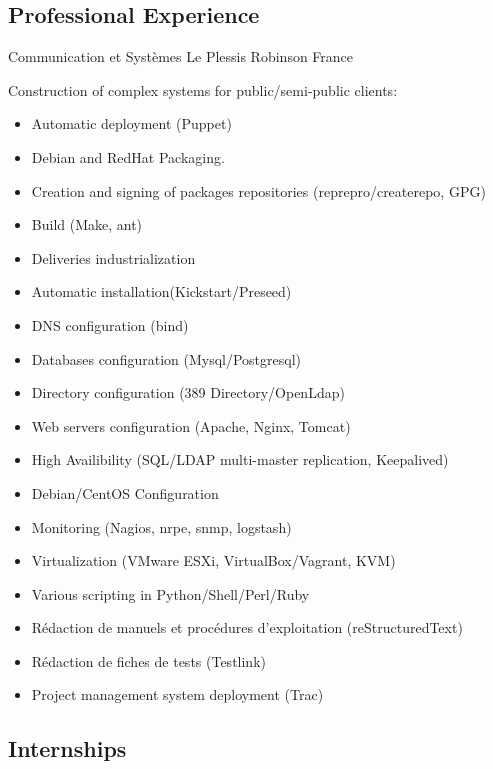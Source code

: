 \documentclass[10pt,a4paper]{moderncv}
\begin{document}
\subsection{Professional Experience}

              {Communication et Systèmes}
              {Le Plessis Robinson}
              {France}
              {Construction of complex systems for public/semi-public clients:
                \begin{itemize}
                \item Automatic deployment (Puppet)
                \item Debian and RedHat Packaging.
                \item Creation and signing of packages repositories (reprepro/createrepo, GPG)
                \item Build (Make, ant)
                \item Deliveries industrialization
                \item Automatic installation(Kickstart/Preseed)
                \item DNS configuration (bind)
                \item Databases configuration (Mysql/Postgresql)
                \item Directory configuration (389 Directory/OpenLdap)
                \item Web servers configuration (Apache, Nginx, Tomcat)
                \item High Availibility (SQL/LDAP multi-master replication, Keepalived)
                \item Debian/CentOS Configuration
                \item Monitoring (Nagios, nrpe, snmp, logstash)
                \item Virtualization (VMware ESXi, VirtualBox/Vagrant, KVM)
                \item Various scripting in Python/Shell/Perl/Ruby
                \item Rédaction de manuels et procédures d'exploitation (reStructuredText)
                \item Rédaction de fiches de tests (Testlink)
                \item Project management system deployment (Trac)
                \end{itemize}
              }

\subsection{Internships}
\end{document}
